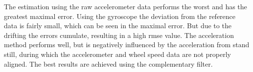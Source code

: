 The estimation using the raw accelerometer data performs the worst and has the greatest maximal error.
Using the gyroscope the deviation from the reference data is fairly small, which can be seen in the maximal error.
But due to the drifting the errors cumulate, resulting in a high \gls{rmse} value.
The acceleration method performs well, but is negatively influenced by the acceleration from stand still, during which the accelerometer and wheel speed data are not properly aligned.
The best results are achieved using the complementary filter.
\begin{table}[t]
    \centering
    \caption[ road grade estimation for uphill drives]{Road grade estimation when driving ramps up.}
    \label{tab:eval_imu_up}
\end{table}
